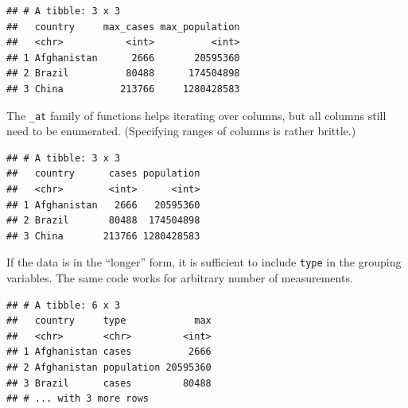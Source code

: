 \documentclass[]{book}
\newenvironment{Shaded}{}{}
\newcommand{\DataTypeTok}[1]{#1}
\newcommand{\KeywordTok}[1]{\textcolor[rgb]{0.00,0.00,1.00}{#1}}
\newcommand{\NormalTok}[1]{#1}
\newcommand{\OperatorTok}[1]{#1}
\newcommand{\StringTok}[1]{\textcolor[rgb]{0.00,0.50,0.50}{#1}}
\begin{document}
\begin{verbatim}
## # A tibble: 3 x 3
##   country     max_cases max_population
##   <chr>           <int>          <int>
## 1 Afghanistan      2666       20595360
## 2 Brazil          80488      174504898
## 3 China          213766     1280428583
\end{verbatim}

The \texttt{\_at} family of functions helps iterating over columns, but all columns still need to be enumerated.
(Specifying ranges of columns is rather brittle.)

\begin{Shaded}
\end{Shaded}

\begin{verbatim}
## # A tibble: 3 x 3
##   country      cases population
##   <chr>        <int>      <int>
## 1 Afghanistan   2666   20595360
## 2 Brazil       80488  174504898
## 3 China       213766 1280428583
\end{verbatim}

If the data is in the ``longer'' form, it is sufficient to include \texttt{type} in the grouping variables.
The same code works for arbitrary number of measurements.

\begin{Shaded}
\end{Shaded}

\begin{verbatim}
## # A tibble: 6 x 3
##   country     type            max
##   <chr>       <chr>         <int>
## 1 Afghanistan cases          2666
## 2 Afghanistan population 20595360
## 3 Brazil      cases         80488
## # ... with 3 more rows
\end{verbatim}
\end{document}
